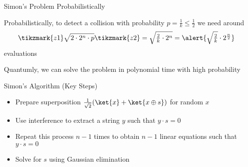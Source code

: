 \documentclass{beamer}
\begin{document}
\begin{frame}{Simon's Problem Probabilistically}

        Probabilistically, to detect a collision with probability $p =
        \frac{1}{k} \leq \frac{1}{2}$ we need around
        \[
                \tikzmark{z1} \sqrt{2 \cdot 2^n \cdot p} \tikzmark{z2} = 
                \textstyle{\sqrt{\frac{2}{k} \cdot 2^n} }
                = \alert{\sqrt{\frac{2}{k}} \cdot 2^{\frac{n}{2}}}
        \]
        evaluations


       Quantumly, we can solve the problem in \alert{polynomial time}
       with high probability
\end{frame}

\begin{frame}{Simon's Algorithm (Key Steps)}
        \begin{itemize}
                \item Prepare superposition $\frac{1}{\sqrt{2}}(\ket{x} +
                        \ket{x \oplus s})$ for random $x$
                \item Use \alert{interference} to extract a string $y$ such that
                        $y \cdot s = 0$
                \item Repeat this process $n-1$ times to obtain $n-1$ linear
                        equations such that $y \cdot s = 0$
                \item Solve for $s$ using Gaussian elimination
        \end{itemize}
\end{frame}
\end{document}
